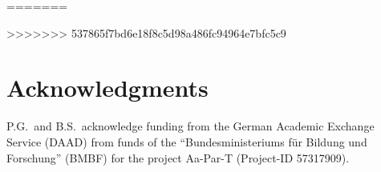 \documentclass[aip,jcp,a4paper,11pt]{revtex4-1}
\begin{document}
%
%
%
%
%

=======
 

%
 
 
 
 
>>>>>>> 537865f7bd6e18f8c5d98a486fc94964e7bfc5c9


\section*{Acknowledgments}
P.G.~and B.S.~acknowledge funding from the German Academic Exchange Service (DAAD) from funds of the ``Bundesministeriums f\"ur Bildung und Forschung'' (BMBF) for the project Aa-Par-T (Project-ID 57317909).
\appendix

%
%
%
%



\end{document}
